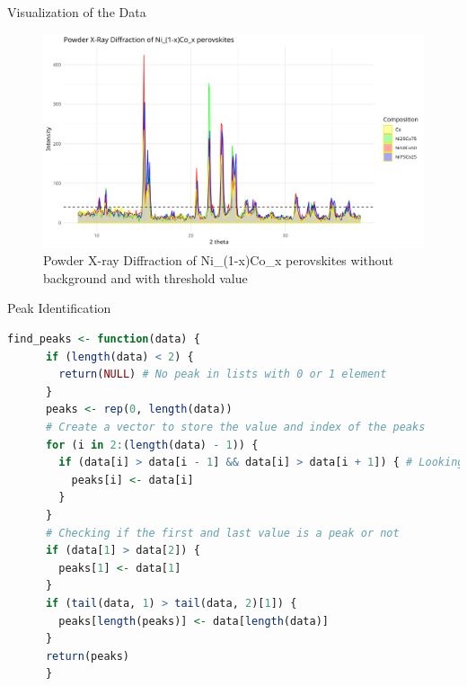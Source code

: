\documentclass[aspectratio=169]{beamer}
\begin{document}
\begin{frame}{Visualization of the Data}
    \begin{figure}
        \centering
        \includegraphics[width=1\textwidth]{../plot/graph.png}
        \caption{Powder X-ray Diffraction of Ni\_(1-x)Co\_x perovskites without background and with threshold value}
        \label{fig:xrd}
    \end{figure}
\end{frame}




\begin{frame}[fragile]{Peak Identification}

    \begin{lstlisting}[language=R, basicstyle=\tiny\ttfamily]
    find_peaks <- function(data) {
      if (length(data) < 2) {
        return(NULL) # No peak in lists with 0 or 1 element
      }
      peaks <- rep(0, length(data))
      # Create a vector to store the value and index of the peaks
      for (i in 2:(length(data) - 1)) {
        if (data[i] > data[i - 1] && data[i] > data[i + 1]) { # Looking for a peak
          peaks[i] <- data[i]
        }
      }
      # Checking if the first and last value is a peak or not
      if (data[1] > data[2]) {
        peaks[1] <- data[1]
      }
      if (tail(data, 1) > tail(data, 2)[1]) {
        peaks[length(peaks)] <- data[length(data)]
      }
      return(peaks)
      }    \end{lstlisting}
\end{frame}
\end{document}

